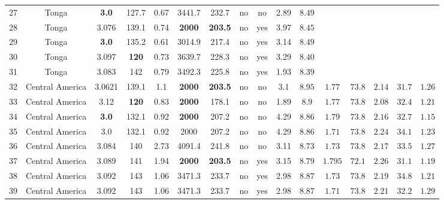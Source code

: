 \documentclass[12pt]{article}
\begin{document}
{\begin{table}
\begin{table}[H]
{\begin{tabular}{c c c c c c c c c c c c c c c c }
          27 &Tonga  & \textbf{3.0}  & 127.7 & 0.67 & 3441.7 &232.7  &no &no &2.89 & $8.49$ \\             
          28 &Tonga  & 3.076 & 139.1 & 0.74& \textbf{2000} & \textbf{203.5} &no &yes &3.97 &$8.45$  \\          
           29 &Tonga  & \textbf{3.0} & 135.2 & 0.61& 3014.9 & 217.4 &no &yes &3.14 &$8.49$ \\             
          30&Tonga  & 3.097 &  \textbf{120} & 0.73 &3639.7 &228.3  &no &yes &3.29& $8.40$  \\             
           31 &Tonga  & 3.083  & 142 & $0.79 $ & 3492.3  &225.8  &no &yes &1.93  & $8.39$ \\             
            32 &Central America  & 3.0621 & 139.1 & 1.1& \textbf{2000} & \textbf{203.5} &no  &no &3.1 & $8.95$ & $1.77$ & $73.8$ & $2.14$ & $31.7$ & $1.26$\\               
            33 &Central America  & 3.12 & \textbf{120} & 0.83& \textbf{2000} & 178.1 &no &no &1.89 & $8.9$ & $1.77$ & $73.8$ & $2.08$ & $32.4$ & $1.21$\\       
            34 &Central America  & \textbf{3.0} & 132.1 & 0.92& \textbf{2000}& 207.2 &no &no &4.29 & $8.86$ & $1.79$ & $73.8$ & $2.16$ & $32.7$ & $1.15$  \\      
            35 &Central America  & 3.0 & 132.1 & 0.92& 2000& 207.2 &no &no &4.29 & $8.86$&  $1.71$ & $73.8$ & $2.24$ & $34.1$ & $1.23$  \\     
            36 &Central America  & 3.084 & 140 & 2.73& 4091.4 & 241.8 &no  &no &3.11 & $8.73$ & $1.73$ & $73.8$ & $2.17$ & $33.5$ & $1.27$\\                           37 &Central America  & 3.089 & 141 & 1.94& \textbf{2000} & \textbf{203.5} &no  &yes & 3.15 & $8.79$ & $1.795$ & $72.1$ & $2.26$ & $31.1$ & $1.19$\\              
           38 &Central America  & 3.092 & 143 & 1.06& 3471.3 & 233.7 &no  &yes &2.98 &$8.87$ & $1.73$ & $73.8$ & $2.19$ & $34.8$ & $1.21$\\       
           39 &Central America  & 3.092 & 143 & 1.06& 3471.3 & 233.7 &no  &yes &2.98 &$8.87$ & $1.71$ & $73.8$ & $2.21$ & $32.2$ & $1.29$\\             
                \hline %
		\end{tabular}
        }
		\label{table:inversions} %
		\end{table}
\end{table}


}
\end{document}
